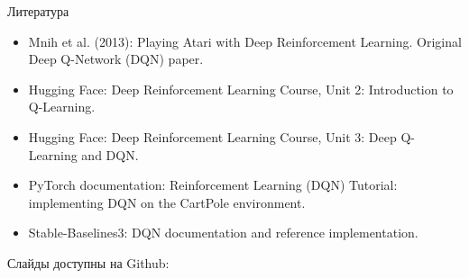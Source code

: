 \documentclass{beamer}
\newcommand{\myqrframe}{
	\begin{frame}
		\begin{center}
			\centerline{Слайды доступны на Github:}
			\bigskip
			\centerline{\mygit}
			\bigskip
			\myqr
		\end{center}
	\end{frame}
}
\begin{document}
	
	\begin{frame}{Литература}
		\begin{itemize}
			
			\item Mnih et al. (2013):
			{Playing Atari with Deep Reinforcement Learning. Original Deep Q-Network (DQN) paper.}
			
			\item Hugging Face:
			{Deep Reinforcement Learning Course, Unit 2: Introduction to Q-Learning.}
			
			\item Hugging Face:
			{Deep Reinforcement Learning Course, Unit 3: Deep Q-Learning and DQN.}
			
			\item PyTorch documentation:
			{Reinforcement Learning (DQN) Tutorial: implementing DQN on the CartPole environment.}
			
			\item Stable-Baselines3:
			{DQN documentation and reference implementation.}
			
		\end{itemize}
	\end{frame}
	
	
	\myqrframe
	
	
	
	
	
	
\end{document}

